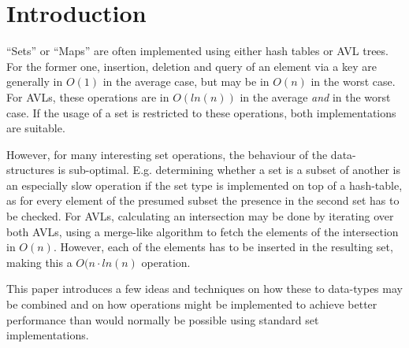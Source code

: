 \section{Introduction}


    ``Sets'' or ``Maps'' are often implemented using either hash tables or AVL
    trees.  For the former one, insertion, deletion and query of an element via
    a key are generally in $O(1)$ in the average case, but may be in $O(n)$ in
    the worst case.  For AVLs, these operations are in $O(ln(n))$ in the average
    \emph{and} in the worst case. If the usage of a set is restricted to these
    operations, both implementations are suitable.

    However, for many interesting set operations, the behaviour of the
    data-structures is sub-optimal. E.g. determining whether a set is a subset
    of another is an especially slow operation if the set type is implemented on
    top of a hash-table, as for every element of the presumed subset the
    presence in the second set has to be checked. For AVLs, calculating an
    intersection may be done by iterating over both AVLs, using a merge-like
    algorithm to fetch the elements of the intersection in $O(n)$. However, each
    of the elements has to be inserted in the resulting set, making this a
    $O(n\cdot ln(n)$ operation.

    This paper introduces a few ideas and techniques on how these to data-types
    may be combined and on how operations might be implemented to achieve better
    performance than would normally be possible using standard set
    implementations.

